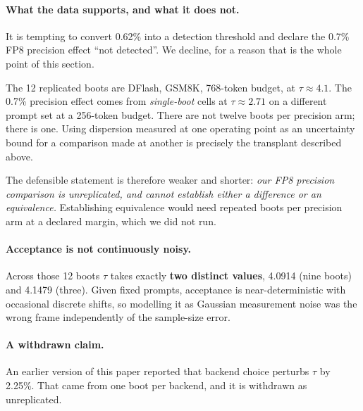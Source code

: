 \documentclass[11pt]{article}
\begin{document}
\paragraph{What the data supports, and what it does not.} It is tempting
to convert 0.62\% into a detection threshold and declare the 0.7\% FP8
precision effect ``not detected''. We decline, for a reason that is the
whole point of this section.

The 12 replicated boots are DFlash, GSM8K, 768-token budget, at
$\tau \approx 4.1$. The 0.7\% precision effect comes from \emph{single-boot}
cells at $\tau \approx 2.71$ on a different prompt set at a 256-token
budget. There are not twelve boots per precision arm; there is one. Using
dispersion measured at one operating point as an uncertainty bound for a
comparison made at another is precisely the transplant described above.

The defensible statement is therefore weaker and shorter: \emph{our FP8
precision comparison is unreplicated, and cannot establish either a
difference or an equivalence.} Establishing equivalence would need repeated
boots per precision arm at a declared margin, which we did not run.

\paragraph{Acceptance is not continuously noisy.} Across those 12 boots
$\tau$ takes exactly \textbf{two distinct values}, 4.0914 (nine boots) and
4.1479 (three). Given fixed prompts, acceptance is near-deterministic with
occasional discrete shifts, so modelling it as Gaussian measurement noise
was the wrong frame independently of the sample-size error.

\paragraph{A withdrawn claim.} An earlier version of this paper reported
that backend choice perturbs $\tau$ by 2.25\%. That came from one boot per
backend, and it is withdrawn as unreplicated.
\end{document}

